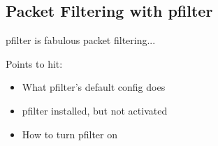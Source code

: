 %
%
%

\subsection{Packet Filtering with pfilter}
\label{app:pfilter-overview}

pfilter is fabulous packet filtering...

Points to hit:

\begin{itemize}
\item What pfilter's default config does
\item pfilter installed, but not activated
\item How to turn pfilter on
\end{itemize}
